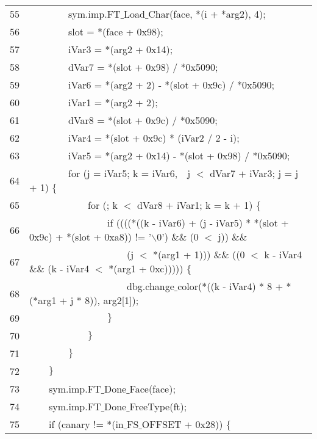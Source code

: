 \documentclass{report}
\newcommand{\tab}{$\quad$}
\newcommand{\csfont}[1]{\fontfamily{cmtt}\selectfont #1}
\begin{document}
\begin{tabular}{c|l}
  55 & {\csfont{\tab \tab \tab \tab sym.imp.FT$\_$Load$\_$Char(face, *(i + *arg2), 4);}} \\
  56 & {\csfont{\tab \tab \tab \tab slot = *(face + 0x98);}} \\
  57 & {\csfont{\tab \tab \tab \tab iVar3 = *(arg2 + 0x14);}} \\
  58 & {\csfont{\tab \tab \tab \tab dVar7 = *(slot + 0x98) / *0x5090;}} \\
  59 & {\csfont{\tab \tab \tab \tab iVar6 = *(arg2 + 2) - *(slot + 0x9c) / *0x5090;}} \\
  60 & {\csfont{\tab \tab \tab \tab iVar1 = *(arg2 + 2);}} \\
  61 & {\csfont{\tab \tab \tab \tab dVar8 = *(slot + 0x9c) / *0x5090;}} \\
  62 & {\csfont{\tab \tab \tab \tab iVar4 = *(slot + 0x9c) * (iVar2 / 2 - i);}} \\
  63 & {\csfont{\tab \tab \tab \tab iVar5 = *(arg2 + 0x14) - *(slot + 0x98) / *0x5090;}} \\
  64 & {\csfont{\tab \tab \tab \tab for (j = iVar5; k = iVar6,\tab j $<$ dVar7 + iVar3; j = j + 1) $\{$}} \\
  65 & {\csfont{\tab \tab \tab \tab \tab \tab for (; k $<$ dVar8 + iVar1; k = k + 1) $\{$}} \\
  66 & {\csfont{\tab \tab \tab \tab \tab \tab \tab \tab if ((((*((k - iVar6) +
  (j - iVar5) * *(slot + 0x9c) + *(slot + 0xa8)) != '$\backslash$0') $\&$$\&$ (0 $<$ j)) $\&\&$}} \\
  67 & {\csfont{\tab \tab \tab \tab \tab \tab \tab \tab \tab \tab (j $<$ *(arg1 + 1))) $\&$$\&$ ((0 $<$ k - iVar4 $\&$$\&$ (k - iVar4 $<$ *(arg1 + 0xc))))) $\{$}} \\
  68 & {\csfont{\tab \tab \tab \tab \tab \tab \tab \tab \tab \tab dbg.change$\_$color(*((k - iVar4) * 8 + *(*arg1 + j * 8)), arg2[1]);}} \\
  69 & {\csfont{\tab \tab \tab \tab \tab \tab \tab \tab $\}$}} \\
  70 & {\csfont{\tab \tab \tab \tab \tab \tab $\}$}} \\
  71 & {\csfont{\tab \tab \tab \tab $\}$}} \\
  72 & {\csfont{\tab \tab $\}$}} \\
  73 & {\csfont{\tab \tab sym.imp.FT$\_$Done$\_$Face(face);}} \\
  74 & {\csfont{\tab \tab sym.imp.FT$\_$Done$\_$FreeType(ft);}} \\
  75 & {\csfont{\tab \tab if (canary != *(in$\_$FS$\_$OFFSET + 0x28)) $\{$}} \\

\end{tabular}
\end{document}
